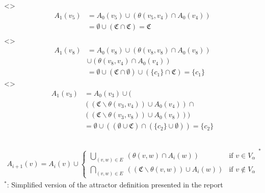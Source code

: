 \documentclass[aspectratio=169]{beamer}
\newcounter{picite}
\begin{document}
\begin{frame}[t]
\begin{columns}[T]
\begin{column}{0.52\textwidth}
{\begin{tabular}{|c|c|c|c|c|c|c|c|c|c|}
		\end{tabular}}
	\setcounter{picite}{0}%
\only<\thepicite>{
	\begin{align*}
	A_1(v_5) &= A_0(v_5) \cup (\theta(v_5,v_4) \cap A_0(v_4))\\
	&= \emptyset \cup (\mathfrak{C} \cap \mathfrak{C}) = \mathfrak{C}\\
	\end{align*}}
\only<\thepicite>{	\begin{align*}
	A_1(v_8) &= A_0(v_8) \cup (\theta(v_8,v_8) \cap A_0(v_8)) \\
	&\cup (\theta(v_8,v_4) \cap A_0(v_4))\\
	&= \emptyset \cup (\mathfrak{C} \cap \emptyset) \cup (\{c_1\} \cap \mathfrak{C}) = \{c_1\}
		\end{align*}}
\only<\thepicite>{
	\begin{align*}	A_1(v_3) &= A_0(v_3) \cup (\\
	& ((\mathfrak{C}\backslash \theta(v_3,v_4)) \cup A_0(v_4)) \cap\\
	& ((\mathfrak{C}\backslash \theta(v_3,v_8)) \cup A_0(v_8)))\\
	&= \emptyset \cup ((\emptyset \cup \mathfrak{C}) \cap (\{c_2\} \cup \emptyset)) = \{c_2\}
	\end{align*}
}
	\end{column}
\end{columns}
\begin{align*}
A_{i+1}(v) = A_i(v) \cup \begin{cases}
\bigcup_{(v,w)\in E}\ (\theta(v,w) \cap A_i(w)) & \text{if }v \in V_\alpha\\
\bigcap_{(v,w)\in E}\ ((\mathfrak{C}\backslash \theta(v,w)) \cup A_i(w)) & \text{if }v \notin V_\alpha
\end{cases}^*
\end{align*}
\tiny$^*$: Simplified version of the attractor definition presented in the report\pause\pause\pause\pause
\end{frame}

\end{document}

